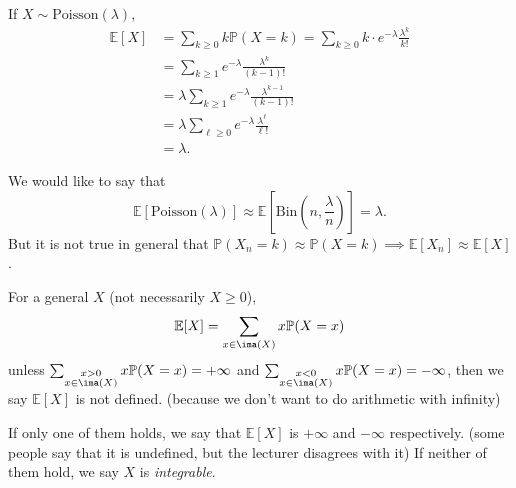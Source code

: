 \begin{example}
    If \(X \sim \mathrm{Poisson}(\lambda)\),
    \begin{align*}
        \mathbb{E}[X] &= \sum_{k \geq 0} k \mathbb{P}(X = k) = \sum_{k \geq 0} k \cdot e^{-\lambda}\frac{\lambda^k}{k!}\\
        &= \sum_{k \geq 1} e^{-\lambda}\frac{\lambda^k}{(k - 1)!}\\
        &= \lambda \sum_{k \geq 1} e^{-\lambda}\frac{\lambda^{k - 1}}{(k - 1)!}\\
        &= \lambda \sum_{\ell \geq 0} e^{-\lambda} \frac{\lambda^{\ell}}{\ell!}\\
        &= \lambda.
    \end{align*}
    \begin{note}
        We would like to say that
        \[
            \mathbb{E}[\mathrm{Poisson} (\lambda)] \approx \mathbb{E}[\mathrm{Bin}(n, \frac{\lambda}{n})] = \lambda.
        \]
        But it is not true in general that \(\mathbb{P}(X_n = k) \approx \mathbb{P}(X = k) \implies \mathbb{E}[X_n] \approx \mathbb{E}[X]\).
    \end{note}
\end{example}
For a general \(X\) (not necessarily \(X \geq 0\)),
\[
    \mathbb{E}[X] = \sum_{x \in \ima(X)} x \mathbb{P}(X = x)
\]
unless \(\sum_{\substack{x > 0\\ x \in \ima(X)}}x \mathbb{P}(X = x) = + \infty\) and \(\sum_{\substack{x < 0\\ x \in \ima(X)}}x \mathbb{P}(X = x) = - \infty\), then we say \(\mathbb{E}[X]\) is not defined. (because we don't want to do arithmetic with infinity)

If only one of them holds, we say that \(\mathbb{E}[X]\) is \(+ \infty\) and \(- \infty\) respectively. (some people say that it is undefined, but the lecturer disagrees with it) If neither of them hold, we say \(X\) is \textit{integrable}.


